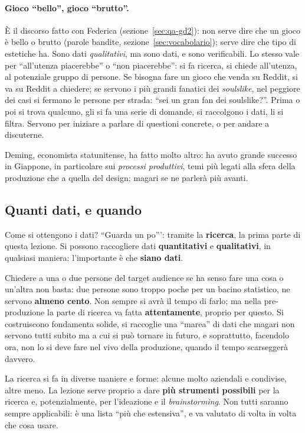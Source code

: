 \paragraph{Gioco ``bello'', gioco ``brutto''.} È il discorso fatto con
Federica (sezione~\ref{sec:qa-gd2}): non serve dire che un gioco è bello o brutto (parole bandite,
sezione~\ref{sec:vocabolario}); serve dire che tipo di estetiche ha. Sono dati
\emph{qualitativi}, ma sono dati, e sono verificabili. Lo stesso vale per
``all'utenza piacerebbe'' o ``non piacerebbe'': si fa ricerca, si chiede
all'utenza, al potenziale gruppo di persone. Se bisogna fare un gioco che
venda su Reddit, si va su Reddit a chiedere; se servono i più grandi fanatici
dei \emph{soulslike}, nel peggiore dei casi si fermano le persone per strada:
``sei un gran fan dei soulslike?''. Prima o poi si trova qualcuno, gli si fa
una serie di domande, si raccolgono i dati, li si filtra. Servono per iniziare
a parlare di questioni concrete, o per andare a discuterne.

Deming, economista statunitense, ha fatto molto altro: ha avuto grande
successo in Giappone, in particolare sui \emph{processi produttivi}, temi più
legati alla sfera della produzione che a quella del design; magari se ne
parlerà più avanti.

\subsection{Quanti dati, e quando}

Come si ottengono i dati? ``Guarda un po''': tramite la \textbf{ricerca}, la
prima parte di questa lezione. Si possono raccogliere dati
\textbf{quantitativi} e \textbf{qualitativi}, in qualsiasi maniera:
l'importante è che \textbf{siano dati}.

Chiedere a una o due persone del target audience se ha senso fare una cosa
o un'altra non basta: due persone sono troppo poche per un bacino statistico,
ne servono \textbf{almeno cento}. Non sempre si avrà il tempo di farlo; ma
nella pre-produzione la parte di ricerca va fatta \textbf{attentamente},
proprio per questo. Si costruiscono fondamenta solide, si raccoglie una
``marea'' di dati che magari non servono tutti subito ma a cui si può tornare
in futuro, e soprattutto, facendolo ora, non lo si deve fare nel vivo della
produzione, quando il tempo scarseggerà davvero.

La ricerca si fa in diverse maniere e forme: alcune molto aziendali e
condivise, altre meno. La lezione serve proprio a dare \textbf{più strumenti
possibili} per la ricerca e, potenzialmente, per l'ideazione e il
\emph{brainstorming}. Non tutti saranno sempre applicabili: è una lista ``più
che estensiva'', e va valutato di volta in volta che cosa usare.

